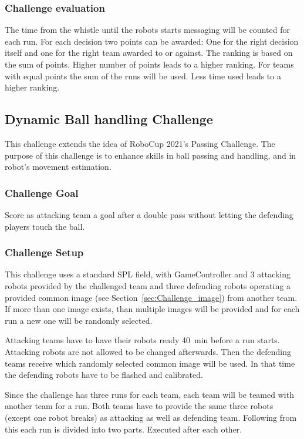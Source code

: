     \subsubsection{Challenge evaluation}
        The time from the whistle until the robots starts messaging will be counted for each run.
        For each decision two points can be awarded: One for the right decision itself and one for the right team awarded to or against.
        The ranking is based on the sum of points. Higher number of points leads to a higher ranking. For teams with equal points the sum of the runs will be used. Less time used leads to a higher ranking.


\subsection{Dynamic Ball handling Challenge}

    This challenge extends the idea of RoboCup 2021's Passing Challenge. The purpose of this challenge is to enhance skills in ball passing and handling, and in robot's movement estimation.

    \subsubsection{Challenge Goal}

        Score as attacking team a goal after a double pass without letting the defending players touch the ball.

    \subsubsection{Challenge Setup}

        This challenge uses a standard SPL field, with GameController and 3 attacking robots provided by the challenged team and three defending robots operating a provided common image (see Section~\ref{sec:Challenge_image}) from another team. If more than one image exists, than multiple images will be provided and for each run a new one will be randomly selected.

        Attacking teams have to have their robots ready \qty{40}{\minute} before a run starts. Attacking robots are not allowed to be changed afterwards. Then the defending teams receive which randomly selected common image will be used. In that time the defending robots have to be flashed and calibrated.

        Since the challenge has three runs for each team, each team will be teamed with another team for a run. Both teams have to provide the same three robots (except one robot breaks) as attacking as well as defending team. Following from this each run is divided into two parts. Executed after each other.

